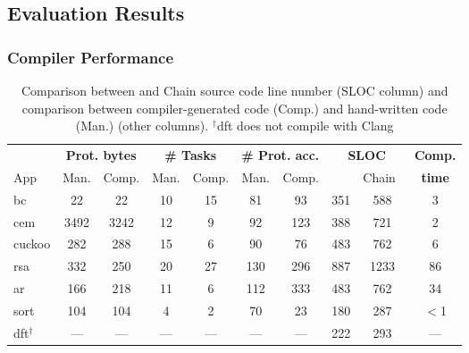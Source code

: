 \subsection{\sys Evaluation Results}
\label{sec:results_evaluation}

\subsubsection{\sys Compiler Performance}
\label{sec:results_compiler}

\begin{table}[t]
	\centering
	\footnotesize
        \renewcommand{\tabcolsep}{1pt}
	\begin{tabular}{|l|cc|cc|cc|cc|c|}
		\hline
		{} & \multicolumn{2}{c|}{{\bf Prot. bytes}} & \multicolumn{2}{c|}{{\bf \# Tasks}} & \multicolumn{2}{c|}{{\bf \# Prot. acc.}} & \multicolumn{2}{c|}{\bf SLOC} & {\bf Comp.} \\
		App & Man. & Comp. & Man. & Comp. & Man. & Comp. & \multicolumn{1}{l}{\sys} & \multicolumn{1}{r|}{Chain~\cite{chain}} & {\bf time} \\
		\hline\hline
		bc & 22 & 22 & 10 & 15 & 81 & 93 & 351 &588 & 3\\
		cem & 3492 & 3242 & 12 & 9 & 92 & 123 & 388 &721 & 2\\
		cuckoo & 282 & 288 & 15 & 6 & 90 & 76 & 483 &762 & 6\\
		rsa & 332 & 250 & 20 & 27 & 130 & 296 & 887 &1233 & 86\\
		ar & 166 & 218 & 11 & 6 & 112 & 333 & 483 &762 & 34\\
		sort & 104 & 104 & 4 & 2 & 70 & 23 & 180 & 287 & $<$1\\
		dft$^\dagger$ & --- & --- & --- & --- & --- & --- & 222 & 293 & ---\\
		\hline
	\end{tabular}
	\caption{Comparison between \sys and Chain source code line number (SLOC column) and comparison between compiler-generated \sys code (Comp.) and hand-written \sys code (Man.) (other columns). $^\dagger$dft does not compile with Clang}
\label{table:compiler_result}
\end{table}

